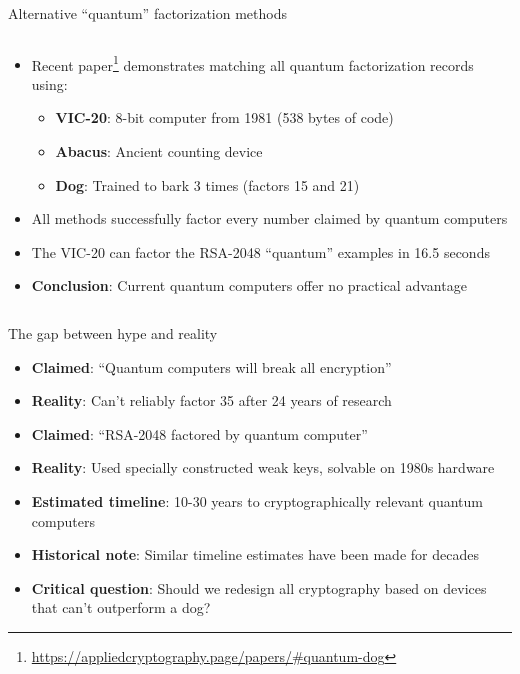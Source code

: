 \documentclass[aspectratio=169, lualatex, handout]{beamer}
\begin{document}
\begin{frame}{Alternative ``quantum'' factorization methods}
	\begin{columns}[c]
		\begin{column}{1\textwidth}
			\begin{itemize}
				\item Recent paper\footnote{\url{https://appliedcryptography.page/papers/\#quantum-dog}} demonstrates matching all quantum factorization records using:
				      \begin{itemize}
					      \item \textbf{VIC-20}: 8-bit computer from 1981 (538 bytes of code)
					      \item \textbf{Abacus}: Ancient counting device
					      \item \textbf{Dog}: Trained to bark 3 times (factors 15 and 21)
				      \end{itemize}
				\item All methods successfully factor every number claimed by quantum computers
				\item The VIC-20 can factor the RSA-2048 ``quantum'' examples in 16.5 seconds
				\item \textbf{Conclusion}: Current quantum computers offer no practical advantage
			\end{itemize}
		\end{column}
	\end{columns}
\end{frame}

\begin{frame}{The gap between hype and reality}
	\begin{itemize}
		\item \textbf{Claimed}: ``Quantum computers will break all encryption''
		\item \textbf{Reality}: Can't reliably factor 35 after 24 years of research
		\item \textbf{Claimed}: ``RSA-2048 factored by quantum computer''
		\item \textbf{Reality}: Used specially constructed weak keys, solvable on 1980s hardware
		\item \textbf{Estimated timeline}: 10-30 years to cryptographically relevant quantum computers
		\item \textbf{Historical note}: Similar timeline estimates have been made for decades
		\item \textbf{Critical question}: Should we redesign all cryptography based on devices that can't outperform a dog?
	\end{itemize}
\end{frame}
\end{document}
